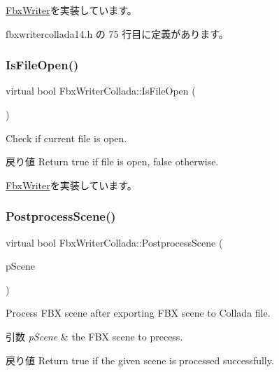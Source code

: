 \hyperlink{class_fbx_writer_ad237f5cd183ae29f744aee32b7aa5525}{Fbx\+Writer}を実装しています。



 fbxwritercollada14.\+h の 75 行目に定義があります。

\mbox{\label{class_fbx_writer_collada_a77c117aa61d57faf57e6810823938cbd}} 
\subsubsection{\texorpdfstring{Is\+File\+Open()}{IsFileOpen()}}
{\footnotesize\ttfamily virtual bool Fbx\+Writer\+Collada\+::\+Is\+File\+Open (\begin{DoxyParamCaption}{ }\end{DoxyParamCaption})\hspace{0.3cm}{\ttfamily [virtual]}}

Check if current file is open. \begin{DoxyReturn}{戻り値}
Return true if file is open, false otherwise. 
\end{DoxyReturn}


\hyperlink{class_fbx_writer_ab70be3aaebd304af11cdce5e225cce68}{Fbx\+Writer}を実装しています。

\mbox{\label{class_fbx_writer_collada_a3f03c5f945df442ecba81efa7d531c64}} 
\subsubsection{\texorpdfstring{Postprocess\+Scene()}{PostprocessScene()}}
{\footnotesize\ttfamily virtual bool Fbx\+Writer\+Collada\+::\+Postprocess\+Scene (\begin{DoxyParamCaption}\item[{\hyperlink{class_fbx_scene}{Fbx\+Scene} \&}]{p\+Scene }\end{DoxyParamCaption})\hspace{0.3cm}{\ttfamily [virtual]}}

Process F\+BX scene after exporting F\+BX scene to Collada file. 
\begin{DoxyParams}{引数}
{\em p\+Scene} & the F\+BX scene to precess. \\
\hline
\end{DoxyParams}
\begin{DoxyReturn}{戻り値}
Return true if the given scene is processed successfully. 
\end{DoxyReturn}


